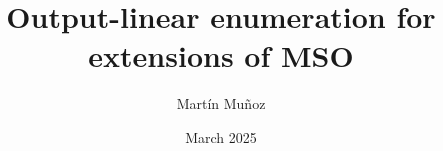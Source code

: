 \documentclass[pdftex]{pucthesis}	%
\begin{document}

\title[Output-linear enumeration for extensions of MSO]
   {\bf Output-linear enumeration for extensions of MSO}       
\author[Martín Muñoz]{Martín Muñoz}

\address{Escuela de Ingenier\'ia\\
                   Pontificia Universidad Cat\'olica de Chile\\ 
                   Vicu\~na Mackenna 4860\\
                  Santiago, Chile\\
                  {\it Tel.\/} : 56 (2) 354-2000}

\subject                            {Computer Science}
\date                                 {March 2025}
\dedication                      {Para Lete}


\NoChapterPageNumber
{}
\maketitle



\end{document}
